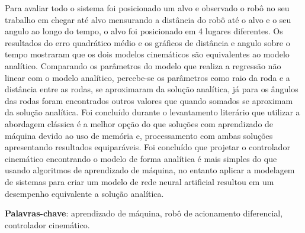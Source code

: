 Para avaliar todo o sistema foi posicionado um alvo e observado o robô no 
seu trabalho em chegar até alvo mensurando a distância do robô até o
alvo e o seu angulo ao longo do tempo, o alvo foi posicionado em 4 lugares
diferentes. Os resultados do erro quadrático médio e os
gráficos de distância e angulo sobre o tempo 
mostraram que os dois modelos cinemáticos são equivalentes ao modelo
analítico. Comparando os parâmetros do modelo que realiza a
regressão não linear com o modelo analítico,
percebe-se os parâmetros como raio da roda e a distância entre as rodas,
se aproximaram da solução analítica, já para os ângulos das rodas foram
encontrados outros valores que quando somados se aproximam da solução
analítica. Foi concluído durante o levantamento literário que
utilizar a abordagem clássica é a melhor opção do que soluções com
aprendizado de máquina devido ao uso de memória e,
processamento com ambas soluções apresentando resultados equiparáveis.
Foi concluído que projetar o controlador cinemático encontrando o modelo
de forma analítica é mais simples do que usando algoritmos de aprendizado
de máquina, no entanto aplicar a modelagem  de sistemas para criar um
modelo de rede neural artificial resultou em um desempenho equivalente
a solução analítica.




\vspace{1.5ex}

{\bf Palavras-chave}: aprendizado de máquina, robô de acionamento diferencial,
controlador cinemático.

%
%

